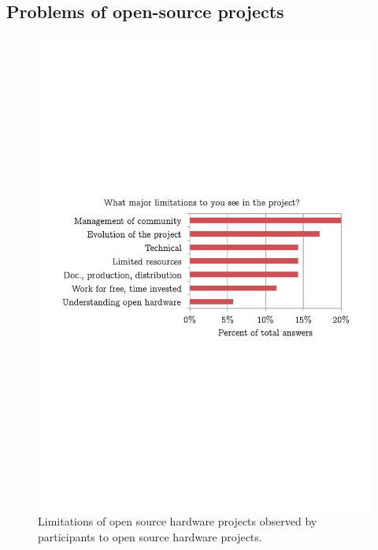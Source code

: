 \documentclass[letterpaper, 10 pt, conference]{ieeeconf}  %
\begin{document}
\subsection{Problems of open-source projects}

\begin{figure}
\centering
\includegraphics[width=\columnwidth]{figures/limitations}
\caption{Limitations of open source hardware projects observed by participants to open source hardware projects.}
\label{fig:problems}
\end{figure}
\end{document}
